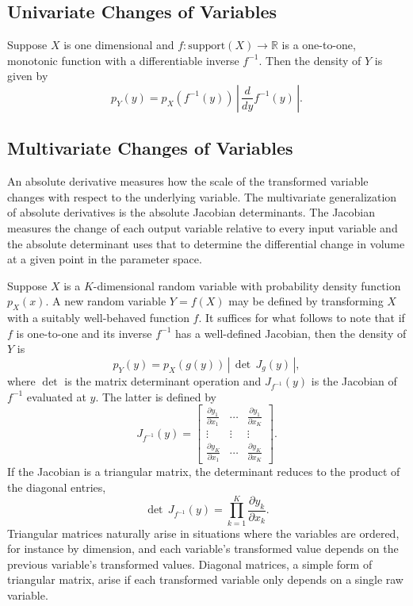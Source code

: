 \documentclass[10pt]{report}
\begin{document}
\subsection{Univariate Changes of Variables}

Suppose $X$ is one dimensional and $f: \mbox{support}(X) \rightarrow
\mathbb{R}$ is a one-to-one, monotonic function with a differentiable
inverse $f^{-1}$.  Then the density of $Y$ is given by
%
\[
p_Y(y) = p_X(f^{-1}(y))  
         \,
         \left| \, \frac{d}{dy} f^{-1}(y)\, \right|.
\]


\subsection{Multivariate Changes of Variables}

An absolute derivative measures how the scale of the transformed
variable changes with respect to the underlying variable.  The
multivariate generalization of absolute derivatives is the absolute
Jacobian determinants.  The Jacobian measures the change of each
output variable relative to every input variable and the absolute
determinant uses that to determine the differential change in volume
at a given point in the parameter space.

Suppose $X$ is a $K$-dimensional random variable with probability
density function $p_X(x)$.  A new random variable $Y = f(X)$ may be
defined by transforming $X$ with a suitably well-behaved function $f$.
It suffices for what follows to note that if $f$ is one-to-one
and its inverse $f^{-1}$ has a well-defined Jacobian, then the
density of $Y$ is
%
\[
p_Y(y) = p_X(g(y)) \, \left| \, \det \, J_g(y) \, \right|,
\]
%
where $\det{}$ is the matrix determinant operation and $J_{f^{-1}}(y)$ is
the Jacobian of $f^{-1}$ evaluated at $y$.  The latter is defined by
\[
J_{f^{-1}}(y) = 
\left[
\begin{array}{ccc}\displaystyle
\frac{\partial y_1}{\partial x_1}
& \cdots
& \displaystyle \frac{\partial y_1}{\partial x_{K}}
\\[6pt]
\vdots & \vdots & \vdots
\\
\displaystyle\frac{\partial y_{K}}{\partial x_1}
& \cdots
& \displaystyle\frac{\partial y_{K}}{\partial x_{K}}
\end{array}
\right].
\]
%
If the Jacobian is a triangular matrix, the determinant reduces to the
product of the diagonal entries,
%
\[
\det \, J_{f^{-1}}(y)
= \prod_{k=1}^K \frac{\partial y_k}{\partial x_k}.
\]
%
Triangular matrices naturally arise in situations where the variables
are ordered, for instance by dimension, and each variable's
transformed value depends on the previous variable's transformed
values.  Diagonal matrices, a simple form of triangular matrix,
arise if each transformed variable only depends on a single raw
variable.
\end{document}
